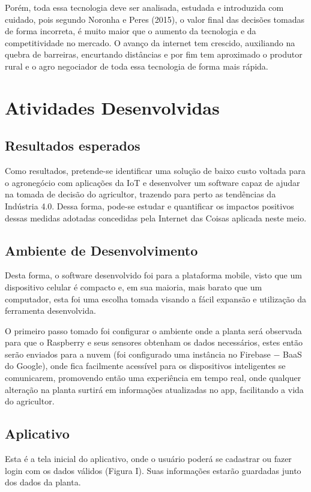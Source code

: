 \documentclass[eso]{bcc}
\begin{document}
Porém, toda essa tecnologia deve ser analisada, estudada e introduzida com cuidado, 
pois segundo Noronha e Peres (2015), o valor final das decisões tomadas de forma incorreta, 
é muito maior que o aumento da tecnologia e da competitividade no mercado. 
O avanço da internet tem crescido, auxiliando na quebra de barreiras, encurtando distâncias e 
por fim tem aproximado o produtor rural e o agro negociador de toda essa tecnologia de forma mais rápida.

\chapter{Atividades Desenvolvidas}\label{chap:atividades}

\section{Resultados esperados}
Como resultados, pretende-se identificar uma solução de baixo custo voltada para o agronegócio 
com aplicações da IoT e desenvolver um software capaz de ajudar na tomada de decisão do agricultor, 
trazendo para perto as tendências da Indústria 4.0. Dessa forma, pode-se estudar e quantificar os 
impactos positivos dessas medidas adotadas concedidas pela Internet das Coisas aplicada neste meio.

\section{Ambiente de Desenvolvimento}
Desta forma, o software desenvolvido foi para a plataforma mobile, visto que um dispositivo 
celular é compacto e, em sua maioria, mais barato que um computador, esta foi uma escolha 
tomada visando a fácil expansão e utilização da ferramenta desenvolvida.

O primeiro passo tomado foi configurar o ambiente onde a planta será observada para que o 
Raspberry e seus sensores obtenham os  dados necessários, estes então serão enviados para a 
nuvem (foi configurado uma instância no Firebase $-$ BaaS do Google), onde fica facilmente acessível 
para os dispositivos inteligentes se comunicarem, promovendo então uma experiência em tempo real, 
onde qualquer alteração na planta surtirá em informações atualizadas no app, facilitando a vida 
do agricultor.

\section{Aplicativo}
Esta é a tela inicial do aplicativo, onde o usuário poderá se cadastrar ou fazer login com 
os dados válidos (Figura I). Suas informações estarão guardadas junto dos dados da planta.
\end{document}
